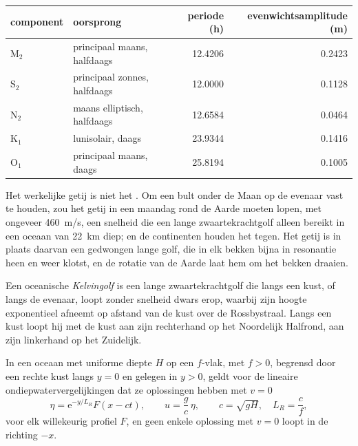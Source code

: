 \begin{center}
\small
\begin{tabular}{llrr}
\hline
component & oorsprong & periode (\unit{h}) & evenwichtsamplitude (\unit{m}) \\
\hline
M$_2$ & principaal maans, halfdaags & \num{12.4206} & \num{0.2423} \\
S$_2$ & principaal zonnes, halfdaags & \num{12.0000} & \num{0.1128} \\
N$_2$ & maans elliptisch, halfdaags & \num{12.6584} & \num{0.0464} \\
K$_1$ & lunisolair, daags & \num{23.9344} & \num{0.1416} \\
O$_1$ & principaal maans, daags & \num{25.8194} & \num{0.1005} \\
\hline
\end{tabular}
\end{center}

Het werkelijke getij is niet het . Om een bult onder de Maan
op de evenaar vast te houden, zou het getij in een maandag rond de Aarde moeten
lopen, met ongeveer \qty{460}{m/s}, een snelheid die een lange zwaartekrachtgolf
alleen bereikt in een oceaan van \qty{22}{km} diep; en de continenten
houden het tegen. Het getij is in plaats daarvan een gedwongen lange golf, die in elk bekken bijna in resonantie heen en weer klotst, en de
rotatie van de Aarde laat hem om het bekken draaien.

\begin{definition}[Kelvingolf]\label{def:b3:ocean-dynamics:kelvin-wave}
Een oceanische \emph{Kelvingolf} is een lange zwaartekrachtgolf
die langs een kust, of langs de evenaar, loopt zonder snelheid dwars erop,
waarbij zijn hoogte exponentieel afneemt op afstand van de kust over de
Rossbystraal. Langs een kust loopt hij met de kust aan zijn rechterhand op het
Noordelijk Halfrond, aan zijn linkerhand op het Zuidelijk.
\end{definition}

\begin{theorem}\label{thm:b3:ocean-dynamics:kelvin}
In een oceaan met uniforme diepte $H$ op een $f$-vlak, met $f > 0$, begrensd door een
rechte kust langs $y = 0$ en gelegen in $y > 0$, geldt voor de lineaire
ondiepwatervergelijkingen dat ze oplossingen hebben met $v = 0$
\[
\eta = \mathrm e^{-y/L_R}F(x - ct),\qquad u = \frac{g}{c}\,\eta,\qquad
c = \sqrt{gH},\quad L_R = \frac{c}{f},
\]
voor elk willekeurig profiel $F$, en geen enkele oplossing met $v = 0$ loopt in de richting
$-x$.
\end{theorem}

